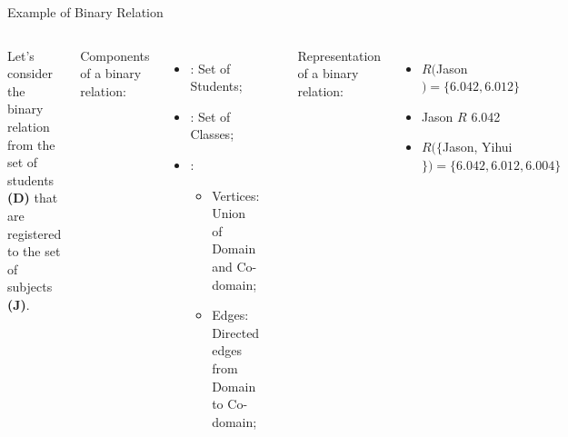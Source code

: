 \begin{frame}{Example of Binary Relation}

  \begin{columns}[t]
    Let's consider the binary relation from the set of students {\bf (D)} that are registered to the set of subjects {\bf (J)}.\bigskip

    Components of a binary relation:
    \begin{itemize}
    \item {}: Set of Students;
    \item {}: Set of Classes;
    \item {}:
    \begin{itemize}
      \item Vertices: Union of Domain and Co-domain;
      \item Edges: Directed edges from Domain to Co-domain;
    \end{itemize}
    \end{itemize}\bigskip


    \begin{center}
      \includegraphics[width=0.6\textwidth]{../img/relations}
    \end{center}
    Representation of a binary relation:
    \begin{itemize}
    \item $R($Jason$) = \{6.042, 6.012\}$
    \item Jason $R$ 6.042
    \item $R(\{$Jason, Yihui$\}) = \{6.042, 6.012, 6.004\}$
    \end{itemize}
  \end{columns}
\end{frame}


